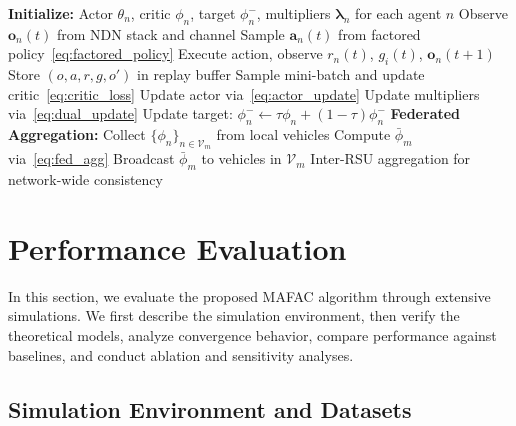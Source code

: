 \documentclass[journal]{IEEEtran}
\begin{document}
\begin{algorithm}[!t]
\caption{MAFAC: Multi-Agent Federated Actor-Critic}
\label{alg:mafac}
\begin{algorithmic}[1]
\State \textbf{Initialize:} Actor $\theta_n$, critic $\phi_n$, target $\phi_n^-$, multipliers $\boldsymbol{\lambda}_n$ for each agent $n$
            \State Observe $\mathbf{o}_n(t)$ from NDN stack and channel
            \State Sample $\mathbf{a}_n(t)$ from factored policy~\eqref{eq:factored_policy}
            \State Execute action, observe $r_n(t)$, $g_i(t)$, $\mathbf{o}_n(t+1)$
            \State Store $(o, a, r, g, o')$ in replay buffer
            \State Sample mini-batch and update critic~\eqref{eq:critic_loss}
            \State Update actor via~\eqref{eq:actor_update}
            \State Update multipliers via~\eqref{eq:dual_update}
            \State Update target: $\phi_n^- \leftarrow \tau \phi_n + (1-\tau)\phi_n^-$
        \EndFor
    \EndFor
    \State \textbf{Federated Aggregation:}
        \State Collect $\{\phi_n\}_{n \in \mathcal{V}_m}$ from local vehicles
        \State Compute $\bar{\phi}_m$ via~\eqref{eq:fed_agg}
        \State Broadcast $\bar{\phi}_m$ to vehicles in $\mathcal{V}_m$
    \EndFor
    \State Inter-RSU aggregation for network-wide consistency
\EndFor
\end{algorithmic}
\end{algorithm}

\section{Performance Evaluation} \label{sec.s}

In this section, we evaluate the proposed MAFAC algorithm through extensive simulations. We first describe the simulation environment, then verify the theoretical models, analyze convergence behavior, compare performance against baselines, and conduct ablation and sensitivity analyses.

\subsection{Simulation Environment and Datasets} \label{sec.s0}
\end{document}
